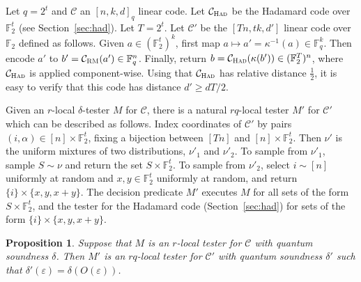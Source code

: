 \documentclass[11pt]{article}
\newtheorem{proposition}[theorem]{Proposition}
\theoremstyle{definition}
\newcommand{\code}{\mathcal{C}}
\newcommand{\F}{\ensuremath{\mathbb{F}}}
\newcommand{\mC}{\ensuremath{\mathcal{C}}}
\newcommand{\RM}{\ensuremath{\textsc{RM}}}
\newcommand{\Had}{\ensuremath{\textsc{Had}}}
\newcommand{\eps}{\varepsilon}
\begin{document}
Let $q=2^t$ and $\code$ an $[n,k,d]_q$ linear code. Let $\code_{\Had}$ be the Hadamard code over $\F_2^t$ (see Section~\ref{sec:had}). Let $T=2^t$.
Let $\mC'$ be the $[Tn,tk,d']$ linear code over $\F_2$ defined as follows. Given $a\in (\F_2^t)^{k}$, first map $a\mapsto a'=\kappa^{-1}(a) \in \F_q^{k}$. Then encode $a'$ to $b'=\code_\RM(a')\in \F_q^n$. Finally, return $b=\code_\Had(\kappa(b'))\in(\F_2^T)^n$, where $\code_\Had$ is applied component-wise. Using that $\code_\Had$ has relative distance $\frac{1}{2}$, it is easy to verify that this code has distance $d'\geq dT/2$.

Given an $r$-local $\delta$-tester $M$ for $\code$, there is a natural $rq$-local tester $M'$ for $\code'$ which can be described as follows. Index coordinates of $\code'$ by pairs $(i,\alpha)\in [n]\times\F_2^t$, fixing a bijection between $[Tn]$ and $[n]\times \F_2^t$. Then $\nu'$ is the uniform mixtures of two distributions, $\nu'_1$ and $\nu'_2$. To sample from $\nu'_1$, sample $S\sim\nu$ and return the set $S\times\F_2^t$. To sample from $\nu'_2$, select $i\sim[n]$ uniformly at random and $x,y\in\F_2^t$ uniformly at random, and return $\{i\}\times\{x,y,x+y\}$. The decision predicate $M'$ executes $M$ for all sets of the form $S\times \F_2^t$, and the tester for the Hadamard code (Section~\ref{sec:had}) for sets of the form $\{i\}\times\{x,y,x+y\}$.


\begin{proposition}\label{prop:q-to-2}
Suppose that $M$ is an $r$-local tester for $\code$ with quantum soundness $\delta$. Then $M'$ is an $rq$-local tester for $\code'$ with quantum soundness $\delta'$ such that $\delta'(\eps)=\delta(O(\eps))$. 
\end{proposition}
\end{document}
